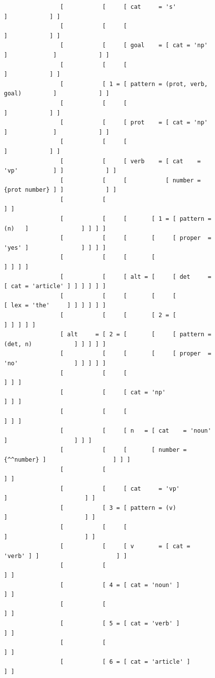 \documentclass[12pt]{article}
\begin{document}
{\pagebreak
\begin{figure}[h!]
{\scriptsize
\begin{verbatim}
                [           [     [ cat     = 's'                        ]            ] ]
                [           [     [                                      ]            ] ]
                [           [     [ goal    = [ cat = 'np' ]             ]            ] ]
                [           [     [                                      ]            ] ]
                [           [ 1 = [ pattern = (prot, verb, goal)         ]            ] ]
                [           [     [                                      ]            ] ]
                [           [     [ prot    = [ cat = 'np' ]             ]            ] ]
                [           [     [                                      ]            ] ]
                [           [     [ verb    = [ cat    = 'vp'          ] ]            ] ]
                [           [     [           [ number = {prot number} ] ]            ] ]
                [           [                                                         ] ]
                [           [     [       [ 1 = [ pattern = (n)   ]               ] ] ] ]
                [           [     [       [     [ proper  = 'yes' ]               ] ] ] ]
                [           [     [       [                                       ] ] ] ]
                [           [     [ alt = [     [ det     = [ cat = 'article' ] ] ] ] ] ]
                [           [     [       [     [           [ lex = 'the'     ] ] ] ] ] ]
                [           [     [       [ 2 = [                               ] ] ] ] ]
                [ alt     = [ 2 = [       [     [ pattern = (det, n)            ] ] ] ] ]
                [           [     [       [     [ proper  = 'no'                ] ] ] ] ]
                [           [     [                                                 ] ] ]
                [           [     [ cat = 'np'                                      ] ] ]
                [           [     [                                                 ] ] ]
                [           [     [ n   = [ cat    = 'noun'     ]                   ] ] ]
                [           [     [       [ number = {^^number} ]                   ] ] ]
                [           [                                                         ] ]
                [           [     [ cat     = 'vp'             ]                      ] ]
                [           [ 3 = [ pattern = (v)              ]                      ] ]
                [           [     [                            ]                      ] ]
                [           [     [ v       = [ cat = 'verb' ] ]                      ] ]
                [           [                                                         ] ]
                [           [ 4 = [ cat = 'noun' ]                                    ] ]
                [           [                                                         ] ]
                [           [ 5 = [ cat = 'verb' ]                                    ] ]
                [           [                                                         ] ]
                [           [ 6 = [ cat = 'article' ]                                 ] ]


\end{verbatim}}
\end{figure}}
\end{document}
